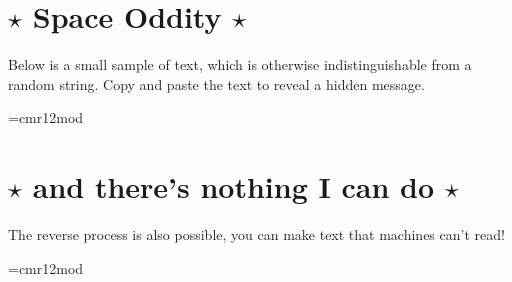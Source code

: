 \documentclass{article}
\newcommand{\linebox}[1]
{
  \vspace{1em}
  {\font\test=cmr12mod \test #1}\newline

{
  \Huge
  \hrulefill\hspace{0.2cm} 
  \floweroneleft\floweroneright \hspace{0.2cm} \hrulefill
}
  \vspace{1em}
}
\begin{document}
\section{$\star$ Space Oddity $\star$}
\Large\noindent

Below is a small sample of text, which is otherwise 
indistinguishable from a random string.
Copy and paste the text to reveal a hidden message.

\linebox{}

\section{$\star$ and there's nothing I can do $\star$}

\noindent
The reverse process is also possible, you can make text that machines can't read!

\linebox{}
\end{document}
